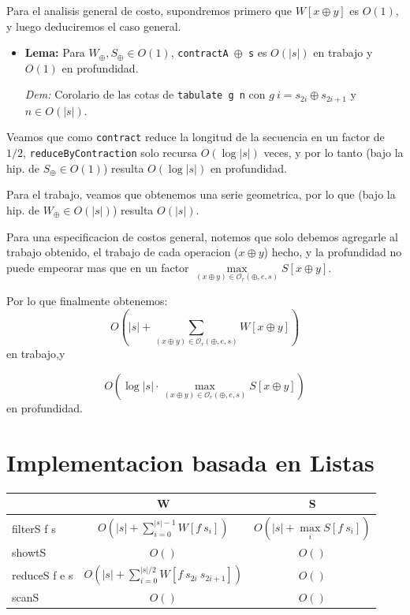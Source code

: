 \documentclass[12pt]{article}
\begin{document}
Para el analisis general de costo, supondremos primero que $W[x \oplus y]$ es $O(1)$, y luego deduciremos el caso general.

\begin{itemize}
\item \textbf{Lema:} Para $W_\oplus,S_\oplus \in O(1)$, \texttt{contractA $\oplus$ s} es $O(|s|)$ en trabajo y $O(1)$ en profundidad.

 \textit{Dem:} Corolario de las cotas de \texttt{tabulate g n} con $g\ i = s_{2i}\oplus s_{2i+1}$ y $n\in O(|s|)$.
\end{itemize}

Veamos que como \texttt{contract} reduce la longitud de la secuencia en un factor de $1/2$, \texttt{reduceByContraction} solo recursa $O(\log |s|)$ veces, y por lo tanto (bajo la hip. de $S_\oplus \in O(1)$) resulta $O(\log |s|)$ en profundidad.

Para el trabajo, veamos que obtenemos una serie geometrica, por lo que (bajo la hip. de $W_\oplus \in O(|s|)$) resulta $O(|s|)$.

Para una especificacion de costos general, notemos que solo debemos agregarle al trabajo obtenido, el trabajo de cada operacion ($x\oplus y$) hecho, y la profundidad no puede empeorar mas que en un factor $\max\limits_{(x\oplus y)\in\mathcal{O}_r(\oplus,e,s)} S[x\oplus y]$.

Por lo que finalmente obtenemos:
$$O(|s| + \sum\limits_{(x\oplus y)\in\mathcal{O}_r(\oplus,e,s)} W[x\oplus y])$$ en trabajo,y

$$ O(\log |s|\cdot \max\limits_{(x\oplus y)\in\mathcal{O}_r(\oplus,e,s)} S[x\oplus y])$$ en profundidad.


\section{Implementacion basada en Listas}

\begin{tabular}{@{}lcc@{}}
\toprule
        & W & S \\ 
\midrule
filterS f s & $O(|s| + \sum\limits_{i=0}^{|s|-1} W[f\ s_i])$  & $O(|s| + \max\limits_{i} S[f\ s_i] )$  \\
showtS  & $O()$  &  $O()$ \\
reduceS f e s & $O(|s| + \sum\limits_{i=0}^{|s|/2} W[f\ s_{2i}\ s_{2i+1}])$  &  $O()$ \\
scanS   & $O()$  &  $O()$ \\ 
\bottomrule
\end{tabular}
\end{document}
